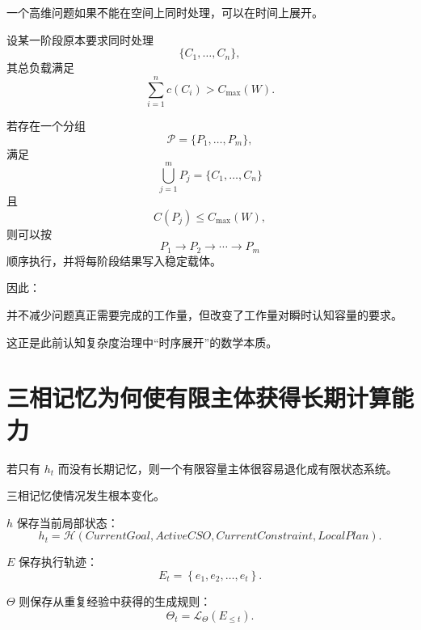一个高维问题如果不能在空间上同时处理，可以在时间上展开。

设某一阶段原本要求同时处理
\begin{equation}
\{C_1,\ldots,C_n\},
\end{equation}
其总负载满足
\begin{equation}
\sum_{i=1}^{n}c(C_i)
>
C_{\max}(W).
\end{equation}

若存在一个分组
\begin{equation}
\mathcal P
=
\{P_1,\ldots,P_m\},
\end{equation}
满足
\begin{equation}
\bigcup_{j=1}^{m}P_j
=
\{C_1,\ldots,C_n\}
\end{equation}
且
\begin{equation}
C(P_j)
\leq
C_{\max}(W),
\end{equation}
则可以按
\begin{equation}
P_1\rightarrow P_2\rightarrow\cdots\rightarrow P_m
\end{equation}
顺序执行，并将每阶段结果写入稳定载体。

因此：

\begin{statementbox}
\centering
{}
\end{statementbox}

并不减少问题真正需要完成的工作量，但改变了工作量对瞬时认知容量的要求。

这正是此前认知复杂度治理中“时序展开”的数学本质。

\section{三相记忆为何使有限主体获得长期计算能力}

若只有 $h_t$ 而没有长期记忆，则一个有限容量主体很容易退化成有限状态系统。

三相记忆使情况发生根本变化。

$h$ 保存当前局部状态：
\begin{equation}
h_t
=
\mathcal H(
CurrentGoal,
ActiveCSO,
CurrentConstraint,
LocalPlan
).
\end{equation}

$E$ 保存执行轨迹：
\begin{equation}
E_t
=
\left\{
e_1,e_2,\ldots,e_t
\right\}.
\end{equation}

$\Theta$ 则保存从重复经验中获得的生成规则：
\begin{equation}
\Theta_t
=
\mathcal L_\Theta(E_{\leq t}).
\end{equation}

